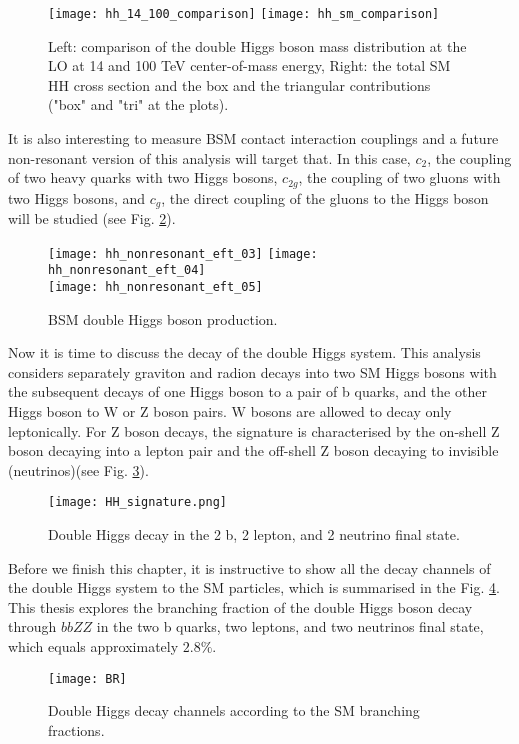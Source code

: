 \begin{figure}[H]
  \centering 
    \texttt{[image: hh\_14\_100\_comparison]}
    \texttt{[image: hh\_sm\_comparison]}
    \caption{Left: comparison of the double Higgs boson mass distribution at the LO at 14 and 100 TeV center-of-mass energy, Right: the total SM HH cross section and the box and the triangular contributions ("box" and "tri" at the plots).}
    \label{hh_comparison}
\end{figure}


It is also interesting to measure BSM contact interaction couplings and a future non-resonant version of this analysis will target that. In this case, $c_2$, the coupling of two heavy quarks with two Higgs bosons, $c_{2g}$, the coupling of two gluons with two Higgs bosons, and $c_g$, the direct coupling of the gluons to the Higgs boson will be studied (see Fig. \ref{BSM_HH}). 

\begin{figure}[H]
  \centering
    \texttt{[image: hh\_nonresonant\_eft\_03]}
    \texttt{[image: hh\_nonresonant\_eft\_04]}\\
     \texttt{[image: hh\_nonresonant\_eft\_05]}
    \caption{BSM double Higgs boson production.}
    \label{BSM_HH}
\end{figure}


Now it is time to discuss the decay of the double Higgs system. 
This analysis considers separately graviton and radion decays into two SM Higgs bosons with the subsequent decays of one Higgs boson to a pair of b quarks, and the other Higgs boson to W or Z boson pairs. W bosons are allowed to decay only leptonically. For Z boson decays, the signature is characterised by the on-shell Z boson decaying into a lepton pair and the off-shell Z boson decaying to invisible (neutrinos)(see Fig. \ref{HH_signature}). 

\begin{figure}[H]
  \centering
    \texttt{[image: HH\_signature.png]}
    \caption{Double Higgs decay in the 2 b, 2 lepton, and 2 neutrino final state. }
    \label{HH_signature}
\end{figure}

Before we finish this chapter, it is instructive to show all the decay channels of the double Higgs system to the SM particles, which is summarised in the Fig. \ref{BR}. This thesis explores the branching fraction of the double Higgs boson decay through $bbZZ$ in the two b quarks, two leptons, and two neutrinos final state, which equals approximately $2.8 \%$. 

\begin{figure}[H]
  \centering
    \texttt{[image: BR]}
    \caption{Double Higgs decay channels according to the SM branching fractions.}
    \label{BR}
\end{figure}



